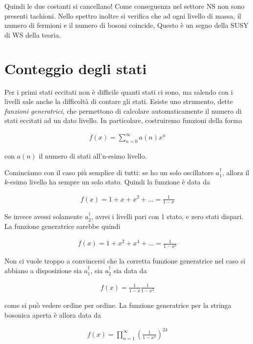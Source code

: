 \documentclass{report}
\begin{document}
Quindi le due costanti si cancellano! Come conseguenza nel settore NS non sono presenti tachioni. Nello spettro inoltre si verifica che ad ogni livello di massa, il numero di fermioni e il numero di bosoni coincide, Questo è un segno della SUSY di WS della teoria. 

\section{Conteggio degli stati}

Per i primi stati eccitati non è difficile quanti stati ci sono, ma salendo con i livelli sale anche la difficoltà di contare gli stati. Esiste uno strumento, dette \emph{funzioni generatrici}, che permettono di calcolare automaticamente il numero di stati eccitati ad un dato livello. In particolare, costruiremo funzioni della forma 

\begin{align}
    f(x) = \sum_{n =0}^{\infty} a(n)x^n
\end{align}

con \(a(n)\) il numero di stati all'n-esimo livello. 

Cominciamo con il caso più semplice di tutti: se ho un solo oscillatore \(a_1^\dagger\), allora il \(k\)-esimo livello ha sempre un solo stato. Quindi la funzione è data da 

\begin{align}
    f(x) = 1 + x + x^2 + \ldots = \frac{1}{1-x}
\end{align}

Se invece avessi solamente \(a_2^\dagger\), avrei i livelli pari con 1 stato, e zero stati dispari. La funzione generatrice sarebbe quindi 

\begin{align}
    f(x) = 1 + x^2 + x^4 + \ldots = \frac{1}{1-x^2}
\end{align}

Non ci vuole troppo a convincersi che la corretta funzione generatrice nel caso si abbiano a disposizione sia \(a_1^\dagger\), sia \(a_2^\dagger\) sia data da 

\begin{align}
    f(x) = \frac{1}{1-x}\frac{1}{1-x^2}
\end{align}

come si può vedere ordine per ordine. La funzione generatrice per la stringa bosonica aperta è allora data da 

\begin{align}
    f(x) = \prod_{n=1}^\infty \left( \frac{1}{1-x^n} \right)^{24}
\end{align}
\end{document}
